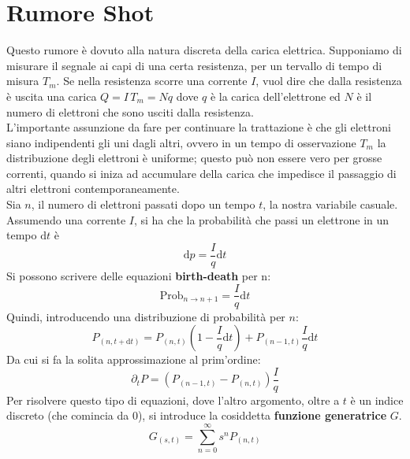 \documentclass[a4paper,12pt]{article}
\renewcommand{\arg}[1]{_{(#1)}}
\theoremstyle{plain}
\theoremstyle{definition}
\newcommand{\f}[2]{\frac{#1}{#2}}
\newcommand{\tdv}{\partial_t}
\renewcommand{\d}{\text{d}}
\theoremstyle{remark}
\begin{document}
	\section{Rumore Shot}
	Questo rumore è dovuto alla natura discreta della carica elettrica.
	Supponiamo di misurare il segnale ai capi di una certa resistenza, per un tervallo di tempo  di misura $T_m$.
	Se nella resistenza scorre una corrente $I$, vuol dire che dalla resistenza è uscita una carica $Q=I\,T_m=N q$ dove $q$ è la carica dell'elettrone ed $N$ è il numero di elettroni che sono usciti dalla resistenza.\\	L'importante assunzione da fare per continuare la trattazione è che gli elettroni siano indipendenti gli uni dagli altri, ovvero in un tempo di osservazione $T_m$ la distribuzione degli elettroni è uniforme; questo può non essere vero per grosse correnti, quando si iniza ad accumulare della carica che impedisce il passaggio di altri elettroni contemporaneamente.
	\\Sia $n$, il numero di elettroni passati dopo un tempo $t$, la nostra variabile casuale. Assumendo una corrente $I$, si ha che la probabilità che passi un elettrone in un tempo $\d t$ è \[\d p=\f{I}{q} \d t\]
	Si possono scrivere delle equazioni \textbf{birth-death} per n:
	\[\text{Prob}_{n\rightarrow n+1}=\f{I}{q} \d t\]
	Quindi, introducendo una distribuzione di probabilità per $n$:
	\[P\arg{n,t+\d t}=P\arg{n,t}(1-\f{I}{q} \d t)+P\arg{n-1,t}\f{I}{q} \d t\]
	Da cui si fa la solita approssimazione al prim'ordine:
	\[\tdv P=\left(P\arg{n-1,t}-P\arg{n,t}\right)\f{I}{q} 	\]
	Per risolvere questo tipo di equazioni, dove l'altro argomento, oltre a $t$ è un indice discreto (che comincia da 0), si introduce la cosiddetta \textbf{funzione generatrice} $G$.
	\[G\arg{s,t}=\sum_{n=0}^\infty s^n P\arg{n,t}\]
\end{document}

